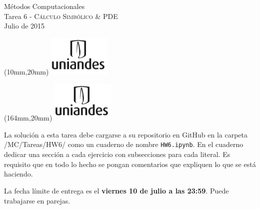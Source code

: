 \documentclass[11pt,legalpaper]{exam}
\begin{document}
\begin{center}
{\Large Métodos Computacionales} \\
Tarea 6 - \textsc{Cálculo Simbólico \& PDE } \\
Julio de 2015
\end{center}

\begin{textblock*}{40mm}(10mm,20mm)
  \includegraphics[width=3cm]{logoUniandes.png}
\end{textblock*}

\begin{textblock*}{40mm}(164mm,20mm)
  \includegraphics[width=3cm]{logoUniandes.png}
\end{textblock*}

\vspace{0.5cm}

La solución a esta tarea debe cargarse a su repositorio en GitHub en la carpeta /MC/Tareas/HW6/ como un  cuaderno de nombre \verb+HW6.ipynb+. En el cuaderno dedicar una sección a cada ejercicio con subsecciones para cada literal. Es requisito que en todo lo hecho se pongan comentarios que expliquen lo que se está haciendo.  

La fecha límite de entrega es el \textbf{viernes 10 de julio a las 23:59}. Puede trabajarse en parejas.

\vspace{0.5cm}
\end{document}
